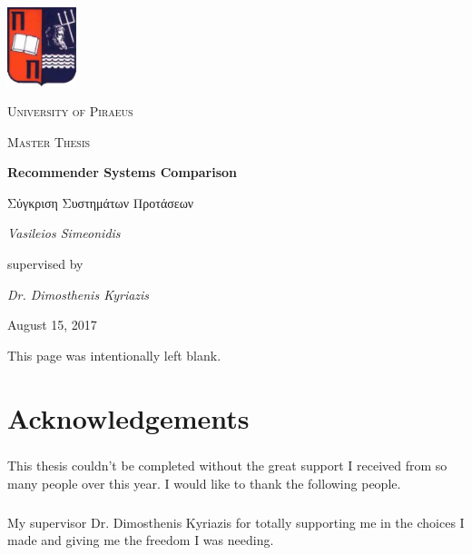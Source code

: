 \documentclass[12pt, a4paper, oneside, greek]{report}
\begin{document}
	\begin{titlepage}
		\centering
		\includegraphics[width=0.15\textwidth]{images/UniversityOfPiraeusLogo.png}\par\vspace{1cm}
		{\scshape\LARGE University of Piraeus \par}
		\vspace{1cm}
		{\scshape\Large Master Thesis\par}
		\vspace{1.5cm}
		{\huge\bfseries Recommender Systems Comparison\par}
		{\Large\itshape \par}

Σύγκριση Συστημάτων Προτάσεων

		\vspace{2cm}
		{\Large\itshape Vasileios Simeonidis\par}
		\vspace{5cm}
		supervised by\par
		\textit{Dr. Dimosthenis Kyriazis}
		\vfill
		{\large August 15, 2017\par}
	\end{titlepage}

\newpage 
\begin{center}
	This page was intentionally left blank.
\end{center}
\newpage
\chapter*{Acknowledgements}

\paragraph{} This thesis couldn't be completed without the great support I received from so many people over this year. I would like to thank the following people.

\paragraph{} My supervisor Dr. Dimosthenis Kyriazis for totally supporting me in the choices I made and giving me the freedom I was needing.
\end{document}
